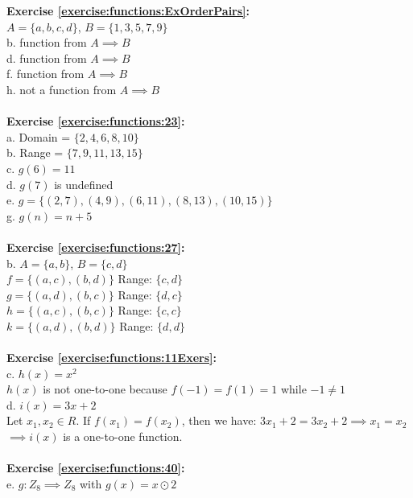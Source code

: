 \textbf{Exercise \ref{exercise:functions:ExOrderPairs}:}\\
$A=\{a,b,c,d\}$, $B=\{1,3,5,7,9\}$\\
b. function from $A \implies B$\\
d. function from $A \implies B$\\
f. function from $A \implies B$\\
h. not a function from $A \implies B$\\
\\
\textbf{Exercise \ref{exercise:functions:23}:}\\
a. Domain = $\{2,4,6,8,10\}$\\
b. Range = $\{7,9,11,13,15\}$\\
c. $g(6)=11$\\
d. $g(7)$ is undefined\\
e. $g=\{(2,7),(4,9),(6,11),(8,13),(10,15)\}$\\
g. $g(n)=n+5$\\
\\
\textbf{Exercise \ref{exercise:functions:27}:}\\
b. $A=\{a,b\}$, $B=\{c,d\}$\\
$f=\{(a,c),(b,d)\}$ Range: $\{c,d\}$\\
$g=\{(a,d),(b,c)\}$ Range: $\{d,c\}$\\
$h=\{(a,c),(b,c)\}$ Range: $\{c,c\}$\\
$k=\{(a,d),(b,d)\}$ Range: $\{d,d\}$\\
\\
\textbf{Exercise \ref{exercise:functions:11Exers}:}\\
c. $h(x)=x^2$\\
$h(x)$ is not one-to-one because $f(-1)=f(1)=1$ while $-1\neq 1$\\
d. $i(x)=3x+2$\\
Let $x_1,x_2 \in R$. If $f(x_1)=f(x_2)$, then we have:
$3x_1+2=3x_2+2 \implies x_1=x_2$\\
$\implies i(x)$ is a one-to-one function.\\
\\
\textbf{Exercise \ref{exercise:functions:40}:}\\
e. $g: Z_8 \implies Z_8$ with $g(x)=x\odot 2$\\
